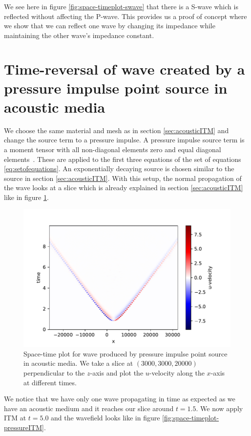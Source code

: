 We see here in figure \ref{fig:space-timeplot-swave} that there is a S-wave which is reflected without affecting the P-wave. 
This provides us a proof of concept where we show that we can reflect one wave by changing its impedance while maintaining the other wave's impedance constant.

\section{Time-reversal of wave created by a pressure impulse point source in acoustic media}\label{sec:pressureimpulse}
We choose the same material and mesh as in section \ref{sec:acousticITM} and change the source term to a pressure impulse. A pressure impulse source term is a moment tensor
with all non-diagonal elements zero and equal diagonal elements~\parencite[Cha. 9]{shearer_2019}. These are applied to the first three equations of the set of equations \ref{eq:setofequations}. 
An exponentially decaying source is chosen similar to the source in section \ref{sec:acousticITM}. With this setup, the normal propagation of the wave looks at a slice which is already explained in section \ref{sec:acousticITM}
like in figure \ref{fig:space-timeplot-pressurenoITM}.

\begin{figure}[htpb]
    \centering
    \includegraphics[width=0.75\linewidth]{figures/pressureimpulsewave-noITM.pdf}
    \caption{Space-time plot for wave produced by pressure impulse point source in acoustic media. We take a slice at $\left(3000,3000,20000\right)$ perpendicular to the $z$-axis and plot the
    $u$-velocity along the $x$-axis at different times.}
    \label{fig:space-timeplot-pressurenoITM}
\end{figure}

We notice that we have only one wave propagating in time as expected as we have an acoustic medium and it reaches our slice around $t=1.5$. We now apply \ac{ITM} at $t=5.0$ and the wavefield looks like in figure \ref{fig:space-timeplot-pressureITM}.

